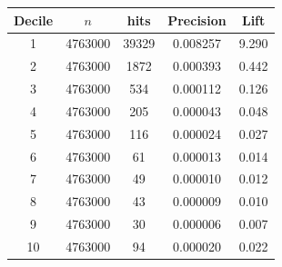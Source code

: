 \begin{tabular}{ccccc}
\toprule
\multicolumn{1}{c}{Decile} &
\multicolumn{1}{c}{$n$} &
\multicolumn{1}{c}{hits} &
\multicolumn{1}{c}{Precision} &
\multicolumn{1}{c}{Lift} \\
\midrule
1  & 4763000 & 39329 & 0.008257 & 9.290 \\
2  & 4763000 & 1872  & 0.000393 & 0.442 \\
3  & 4763000 & 534   & 0.000112 & 0.126 \\
4  & 4763000 & 205   & 0.000043 & 0.048 \\
5  & 4763000 & 116   & 0.000024 & 0.027 \\
6  & 4763000 & 61    & 0.000013 & 0.014 \\
7  & 4763000 & 49    & 0.000010 & 0.012 \\
8  & 4763000 & 43    & 0.000009 & 0.010 \\
9  & 4763000 & 30    & 0.000006 & 0.007 \\
10 & 4763000 & 94    & 0.000020 & 0.022 \\
\bottomrule
\end{tabular}
